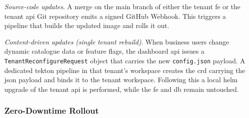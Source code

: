 \documentclass[11pt, a4paper, oneside, listof=totoc]{scrartcl}
\begin{document}
                \begin{enumerate}[label={[\arabic*]:},
                    ref=Challenge~\arabic*,
                    leftmargin=*,
                    itemsep=0.6\baselineskip]

                    \item\label{chal:cdCode}
                        \textit{Source-code updates}.
                        A merge on the main branch of either the tenant \gls{fe} or the tenant
                        \gls{api} Git repository emits a signed GitHub Webhook.
                        This triggers a pipeline that builds the updated image and rolls it out.
                        
                    \item\label{chal:cdData}
                        \textit{Content-driven updates (single tenant rebuild)}.
                        When business users change dynamic catalogue data or feature flags, the
                        dashboard \gls{api} issues a \texttt{TenantReconfigureRequest} object
                        that carries the new \texttt{config.json} payload.  
                        A dedicated \gls{tekton} pipeline in that tenant's workspace creates
                        the \gls{crd} carrying the \gls{json} payload and binds it to the tenant
                        workspace.
                        Following this a local \gls{helm} upgrade of the tenant \gls{api} is
                        performed, while the \gls{fe} and \gls{db} remain untouched.

                \end{enumerate}

                \subsubsection{Zero-Downtime Rollout}\label{subsubsec:zeroDowntime}
\end{document}
